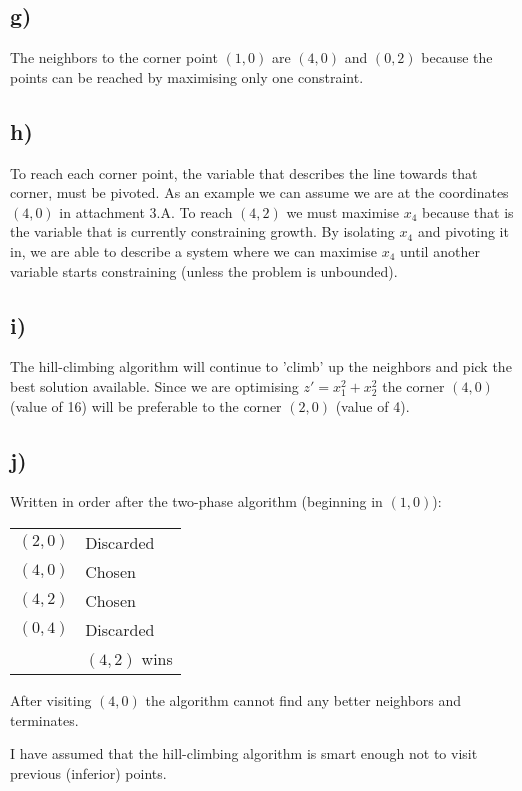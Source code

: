 \documentclass[12pt,a4paper]{article}
\begin{document}
\subsection*{g)}
The neighbors to the corner point $(1, 0)$ are $(4, 0)$ and $(0, 2)$ because
the points can be reached by maximising only one constraint.

\subsection*{h)}
To reach each corner point, the variable that describes the line towards that
corner, must be pivoted. As an example we can assume we are at the coordinates
$(4, 0)$ in attachment 3.A. To reach $(4, 2)$ we must maximise $x_4$ because
that is the variable that is currently constraining growth. By isolating $x_4$
and pivoting it in, we are able to describe a system where we can maximise $x_4$
until another variable starts constraining (unless the problem is unbounded).

\subsection*{i)}
The hill-climbing algorithm will continue to 'climb' up the neighbors and pick
the best solution available. Since we are optimising $z' = x_1^2 + x_2^2$
the corner $(4, 0)$ (value of 16) will be preferable to the corner $(2, 0)$
(value of 4).

\subsection*{j)}
Written in order after the two-phase algorithm (beginning in $(1, 0)$):
\begin{tabular}{l l}
$(2, 0)$ & Discarded\\
$(4, 0)$ & Chosen \\
$(4, 2)$ & Chosen \\
$(0, 4)$ & Discarded \\
         & $(4, 2)$ wins
\end{tabular}
After visiting $(4, 0)$ the algorithm cannot find any better neighbors and
terminates.

I have assumed that the hill-climbing algorithm is smart enough not to visit
previous (inferior) points.
\end{document}

